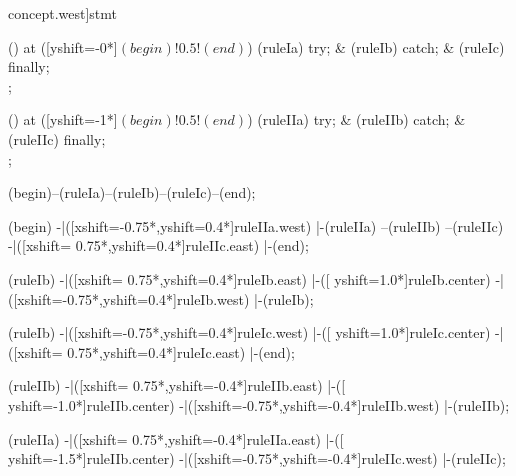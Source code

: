 \begin{syntax}[[xshift=22mm]concept.west]{stmt}
  
  \node[sequence,column sep=2.0cm] () at ([yshift=-0*\syntaxruledist]$(begin)!0.5!(end)$) {
    \node[terminal]    (ruleIa) {try};
    &
    \node[nonterminal] (ruleIb) {catch};
    &
    \node[nonterminal] (ruleIc) {finally};
    \\
  };
  
  \node[sequence,column sep=2.0cm] () at ([yshift=-1*\syntaxruledist]$(begin)!0.5!(end)$) {
    \node[terminal]    (ruleIIa) {try};
    &
    \node[nonterminal] (ruleIIb) {catch};
    &
    \node[nonterminal] (ruleIIc) {finally};
    \\
  };
  
  \draw[path] (begin)--(ruleIa)--(ruleIb)--(ruleIc)--(end);
  
  \draw[path] (begin)
            -|([xshift=-0.75*\syntaxruledist,yshift=0.4*\syntaxruledist]ruleIIa.west)
            |-(ruleIIa)
            --(ruleIIb)
            --(ruleIIc)
            -|([xshift= 0.75*\syntaxruledist,yshift=0.4*\syntaxruledist]ruleIIc.east)
            |-(end);
  
  \draw[path] (ruleIb)
            -|([xshift= 0.75*\syntaxruledist,yshift=0.4*\syntaxruledist]ruleIb.east)
            |-([                             yshift=1.0*\syntaxruledist]ruleIb.center)
            -|([xshift=-0.75*\syntaxruledist,yshift=0.4*\syntaxruledist]ruleIb.west)
            |-(ruleIb);
  
  \draw[path] (ruleIb)
            -|([xshift=-0.75*\syntaxruledist,yshift=0.4*\syntaxruledist]ruleIc.west)
            |-([                             yshift=1.0*\syntaxruledist]ruleIc.center)
            -|([xshift= 0.75*\syntaxruledist,yshift=0.4*\syntaxruledist]ruleIc.east)
            |-(end);
  
  \draw[path] (ruleIIb)
            -|([xshift= 0.75*\syntaxruledist,yshift=-0.4*\syntaxruledist]ruleIIb.east)
            |-([                             yshift=-1.0*\syntaxruledist]ruleIIb.center)
            -|([xshift=-0.75*\syntaxruledist,yshift=-0.4*\syntaxruledist]ruleIIb.west)
            |-(ruleIIb);
  
  \draw[path] (ruleIIa)
            -|([xshift= 0.75*\syntaxruledist,yshift=-0.4*\syntaxruledist]ruleIIa.east)
            |-([                             yshift=-1.5*\syntaxruledist]ruleIIb.center)
            -|([xshift=-0.75*\syntaxruledist,yshift=-0.4*\syntaxruledist]ruleIIc.west)
            |-(ruleIIc);
\end{syntax}
